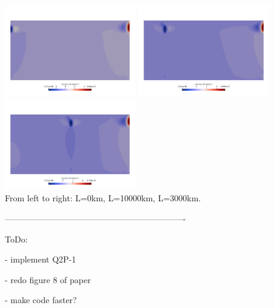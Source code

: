 \begin{center}
\includegraphics[width=5.7cm]{python_codes/fieldstone_143/results/fig9/v0000}
\includegraphics[width=5.7cm]{python_codes/fieldstone_143/results/fig9/v1000}
\includegraphics[width=5.7cm]{python_codes/fieldstone_143/results/fig9/v3000}\\
{\captionfont From left to right: L=0km, L=10000km, L=3000km.}
\end{center}

----------------------------------------------------------------

ToDo:

- implement Q2P-1

- redo figure 8 of paper

- make code faster?

































